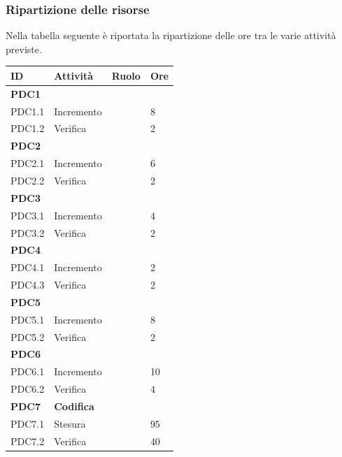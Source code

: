 \documentclass[12pt,a4paper]{article}
\begin{document}
\newpage
\subsubsection{Ripartizione delle risorse}
Nella tabella seguente è riportata la ripartizione delle ore tra le varie attività previste.

\begin{table}[H]
	\begin{center}
		\begin{tabular}{p{} p{} p{} p{}}
			\toprule
			\textbf{ID}	& \textbf{Attività}	& \textbf{Ruolo} & \textbf{Ore} \\ \midrule
			\midrule
			\textbf{PDC1} & \textbf{\AdR{}} & &  \\ \midrule
			PDC1.1 & Incremento & \AN{} & 8 \\ \midrule
			PDC1.2 & Verifica & \VR{} & 2 \\ \midrule
			\textbf{PDC2} & \textbf{\NdP{}} &  & \\ \midrule
			PDC2.1 & Incremento & \AM{} & 6 \\ \midrule
			PDC2.2 & Verifica & \VR{} & 2 \\ \midrule
			\textbf{PDC3} & \textbf{\PdP{}} & &  \\ \midrule
			PDC3.1 & Incremento & \RE{} & 4 \\ \midrule
			PDC3.2 & Verifica & \VR{} & 2 \\ \midrule
			\textbf{PDC4} & \textbf{\PdQ{}} & & \\ \midrule
			PDC4.1 & Incremento & \RE{} \newline \PG & 2 \newline 6 \\ \midrule
			PDC4.3 & Verifica & \VR{} & 2 \\ \midrule
			\textbf{PDC5} & \textbf{\ST{}} & & \\ \midrule
			PDC5.1 & Incremento & \PG{} & 8 \\ \midrule
			PDC5.2 & Verifica & \VR{} & 2 \\ \midrule
			\textbf{PDC6} & \textbf{\DP{}} & & \\ \midrule
			PDC6.1 & Incremento & \PG{} & 10 \\ \midrule
			PDC6.2 & Verifica & \VR{} & 4 \\ \midrule
			\textbf{PDC7} & \textbf{Codifica} & & \\ \midrule
			PDC7.1 & Stesura & \PR{} & 95 \\ \midrule
			PDC7.2 & Verifica & \VR{} & 40 \\ \midrule

\end{tabular}
\end{center}
\end{table}
\end{document}
